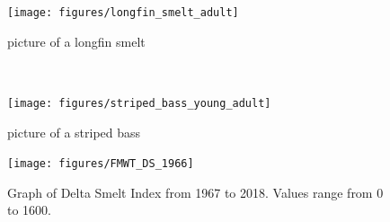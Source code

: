 \documentclass[
]{book}
\begin{document}
\begin{panel-grid}
\begin{columns-nocenter}
\begin{column800}

\begin{figure}

{\centering \texttt{[image: figures/longfin\_smelt\_adult]} 

}

\caption{picture of a longfin smelt}\label{fig:unnamed-chunk-122}
\end{figure}

\end{column800}

\begin{column40}

~

\end{column40}

\begin{column800}

\begin{figure}

{\centering \texttt{[image: figures/striped\_bass\_young\_adult]} 

}

\caption{picture of a striped bass}\label{fig:unnamed-chunk-123}
\end{figure}

\end{column800}

\end{columns-nocenter}

\begin{columns-nocenter}

\begin{column800}

\begin{expand}

\begin{figure}
\texttt{[image: figures/FMWT\_DS\_1966]} \caption{Graph of Delta Smelt Index from 1967 to 2018. Values range from 0 to 1600.}\label{fig:unnamed-chunk-124}
\end{figure}

\end{expand}

\end{column800}

\begin{column40}

~

\end{column40}

\begin{column800}


\end{column800}
\end{columns-nocenter}
\end{panel-grid}
\end{document}
